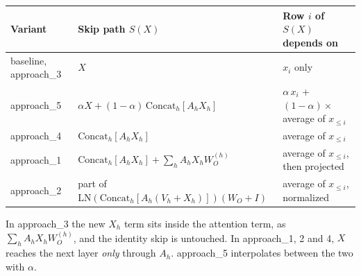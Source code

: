 \documentclass[11pt]{article}
\newcommand{\cat}{\mathrm{Concat}_h}
\begin{document}
\begin{center}\small
\begin{tabular}{lll}
\toprule
Variant & Skip path $S(X)$ & Row $i$ of $S(X)$ depends on \\
\midrule
baseline, approach\_3 & $X$ & $x_i$ only \\
approach\_5 & $\alpha X + (1-\alpha)\,\cat[A_hX_h]$ & $\alpha\,x_i$ \;+\; $(1{-}\alpha)\times$ average of $x_{\le i}$ \\
approach\_4 & $\cat[A_hX_h]$ & average of $x_{\le i}$ \\
approach\_1 & $\cat[A_hX_h] + \sum_h A_hX_hW_O^{(h)}$ & average of $x_{\le i}$, then projected \\
approach\_2 & part of $\mathrm{LN}(\cat[A_h(V_h{+}X_h)])(W_O{+}I)$ & average of $x_{\le i}$, normalized \\
\bottomrule
\end{tabular}
\end{center}

In approach\_3 the new $X_h$ term sits inside the attention term, as $\sum_h A_hX_hW_O^{(h)}$, and the identity
skip is untouched. In approach\_1, 2 and 4, $X$ reaches the next layer \emph{only} through $A_h$. approach\_5
interpolates between the two with $\alpha$.
\end{document}
